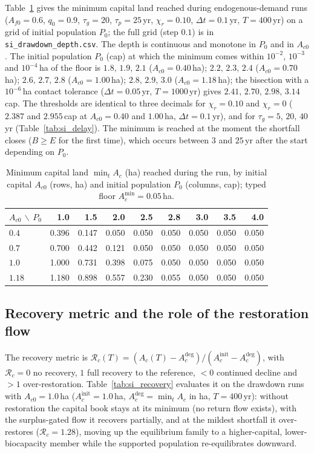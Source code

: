\documentclass[11pt,a4paper]{article}
\newcommand{\Acmin}{A_c^{\min}}
\begin{document}
Table~\ref{tab:si_drawdown} gives the minimum capital land reached during endogenous-demand runs ($A_{f0}=0.6$, $q_0=0.9$, $\tau_g=20$, $\tau_p=25$\,yr, $\chi_r=0.10$, $\Delta t=0.1$\,yr, $T=400$\,yr) on a grid of initial population $P_0$; the full grid (step $0.1$) is in \texttt{si\_drawdown\_depth.csv}. The depth is continuous and monotone in $P_0$ and in $A_{c0}$. The initial population $P_0$ (cap) at which the minimum comes within $10^{-2}$, $10^{-3}$ and $10^{-4}$\,ha of the floor is $1.8,\,1.9,\,2.1$ ($A_{c0}=0.40$\,ha); $2.2,\,2.3,\,2.4$ ($A_{c0}=0.70$\,ha); $2.6,\,2.7,\,2.8$ ($A_{c0}=1.00$\,ha); $2.8,\,2.9,\,3.0$ ($A_{c0}=1.18$\,ha); the bisection with a $10^{-6}$\,ha contact tolerance ($\Delta t=0.05$\,yr, $T=1000$\,yr) gives $2.41,\,2.70,\,2.98,\,3.14$\,cap. The thresholds are identical to three decimals for $\chi_r=0.10$ and $\chi_r=0$ ($2.387$ and $2.955$\,cap at $A_{c0}=0.40$ and $1.00$\,ha, $\Delta t=0.1$\,yr), and for $\tau_g=5,\,20,\,40$\,yr (Table~\ref{tab:si_delay}). The minimum is reached at the moment the shortfall closes ($B\ge E$ for the first time), which occurs between $3$ and $25$\,yr after the start depending on $P_0$.

\begin{table}[htbp]
\centering\small
\caption{Minimum capital land $\min_tA_c$ (ha) reached during the run, by initial capital $A_{c0}$ (rows, ha) and initial population $P_0$ (columns, cap); typed floor $\Acmin=0.05$\,ha.}
\label{tab:si_drawdown}
\begin{tabular}{lrrrrrrrr}
\toprule
$A_{c0}$ $\backslash$ $P_0$ & 1.0 & 1.5 & 2.0 & 2.5 & 2.8 & 3.0 & 3.5 & 4.0 \\
\midrule
$0.4$ & 0.396 & 0.147 & 0.050 & 0.050 & 0.050 & 0.050 & 0.050 & 0.050 \\
$0.7$ & 0.700 & 0.442 & 0.121 & 0.050 & 0.050 & 0.050 & 0.050 & 0.050 \\
$1.0$ & 1.000 & 0.731 & 0.398 & 0.075 & 0.050 & 0.050 & 0.050 & 0.050 \\
$1.18$ & 1.180 & 0.898 & 0.557 & 0.230 & 0.055 & 0.050 & 0.050 & 0.050 \\
\bottomrule
\end{tabular}
\end{table}

\subsection{Recovery metric and the role of the restoration flow}\label{si:recovery}

The recovery metric is $\mathcal R_c(T)=(A_c(T)-A_c^{\mathrm{deg}})/(A_c^{\mathrm{init}}-A_c^{\mathrm{deg}})$, with $\mathcal R_c=0$ no recovery, $1$ full recovery to the reference, $<0$ continued decline and $>1$ over-restoration. Table~\ref{tab:si_recovery} evaluates it on the drawdown runs with $A_{c0}=1.0$\,ha ($A_c^{\mathrm{init}}=1.0$\,ha, $A_c^{\mathrm{deg}}=\min_tA_c$ in ha, $T=400$\,yr): without restoration the capital book stays at its minimum (no return flow exists), with the surplus-gated flow it recovers partially, and at the mildest shortfall it over-restores ($\mathcal R_c=1.28$), moving up the equilibrium family to a higher-capital, lower-biocapacity member while the supported population re-equilibrates downward.
\end{document}
